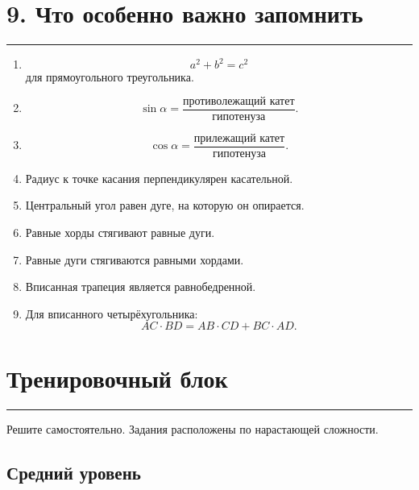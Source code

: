 \documentclass[a4paper,12pt]{article}
\newcommand{\sectionrule}{
  \par
  \vspace{0.2em}
  \noindent
  \textcolor{accent}{\rule{\linewidth}{0.7pt}}
  \vspace{0.35em}
}
\begin{document}
\section*{9. Что особенно важно запомнить}
\sectionrule

\begin{enumerate}

  \item
  \[
  a^2+b^2=c^2
  \]
  для прямоугольного треугольника.

  \item
  \[
  \sin\alpha
  =
  \frac{\text{противолежащий катет}}
       {\text{гипотенуза}}.
  \]

  \item
  \[
  \cos\alpha
  =
  \frac{\text{прилежащий катет}}
       {\text{гипотенуза}}.
  \]

  \item Радиус к точке касания
  перпендикулярен касательной.

  \item Центральный угол равен дуге,
  на которую он опирается.

  \item Равные хорды
  стягивают равные дуги.

  \item Равные дуги
  стягиваются равными хордами.

  \item Вписанная трапеция
  является равнобедренной.

  \item Для вписанного четырёхугольника:
  \[
  AC\cdot BD
  =
  AB\cdot CD
  +
  BC\cdot AD.
  \]

\end{enumerate}


\newpage

\section*{Тренировочный блок}
\sectionrule

\textcolor{textgray}{
Решите самостоятельно.
Задания расположены по нарастающей сложности.
}

\subsection*{Средний уровень}
\end{document}
